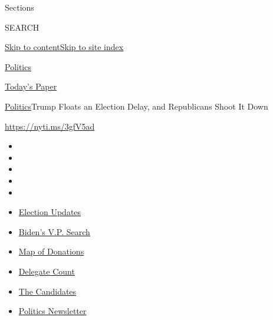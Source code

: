Sections

SEARCH

\protect\hyperlink{site-content}{Skip to
content}\protect\hyperlink{site-index}{Skip to site index}

\href{https://www.nytimes.com/section/politics}{Politics}

\href{https://myaccount.nytimes.com/auth/login?response_type=cookie\&client_id=vi}{}

\href{https://www.nytimes.com/section/todayspaper}{Today's Paper}

\href{/section/politics}{Politics}\textbar{}Trump Floats an Election
Delay, and Republicans Shoot It Down

\url{https://nyti.ms/3gfV5ad}

\begin{itemize}
\item
\item
\item
\item
\item
\end{itemize}

\begin{itemize}
\item
  \href{https://www.nytimes.com/2020/08/04/us/elections/primary-election-michigan-arizona-kansas.html?action=click\&pgtype=Article\&state=default\&region=TOP_BANNER\&context=storylines_menu}{Election
  Updates}
\item
  \href{https://www.nytimes.com/article/biden-vice-president-2020.html?action=click\&pgtype=Article\&state=default\&region=TOP_BANNER\&context=storylines_menu}{Biden's
  V.P. Search}
\item
  \href{https://www.nytimes.com/interactive/2020/07/24/us/politics/trump-biden-campaign-donors.html?action=click\&pgtype=Article\&state=default\&region=TOP_BANNER\&context=storylines_menu}{Map
  of Donations}
\item
  \href{https://www.nytimes.com/interactive/2020/us/elections/delegate-count-primary-results.html?action=click\&pgtype=Article\&state=default\&region=TOP_BANNER\&context=storylines_menu}{Delegate
  Count}
\item
  \href{https://www.nytimes.com/interactive/2019/us/politics/2020-presidential-candidates.html?action=click\&pgtype=Article\&state=default\&region=TOP_BANNER\&context=storylines_menu}{The
  Candidates}
\item
  \href{https://www.nytimes.com/newsletters/politics?action=click\&pgtype=Article\&state=default\&region=TOP_BANNER\&context=storylines_menu}{Politics
  Newsletter}
\end{itemize}

